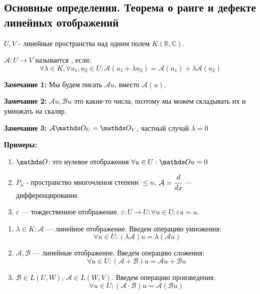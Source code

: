 \subsection{Основные определения. Теорема о ранге и дефекте линейных отображений}

 $U,V$ - линейные пространства над одним полем $K(\mathbb{R}, \mathbb{C})$.

$\mathcal{A}: U\rightarrow V$ называется , если: 
$$\forall \lambda \in K,\forall u_1, u_2 \in U: \mathcal{A}(u_1 + \lambda u_2) = \mathcal{A} (u_1) + \lambda\mathcal{A}(u_2)$$

\textbf{Замечание 1:} Мы будем писать $\mathcal{A} u$, вместо $\mathcal{A}(u)$.

\textbf{Замечание 2:} $\mathcal{A}u, \mathcal{B}u$ это какие-то числа, поэтому мы можем складывать их и умножать на скаляр.

\textbf{Замечание 3:} $\mathcal{A} \zero_U = \zero_V$, частный случай $\lambda = 0$

\textbf{Примеры:}
\begin{enumerate}
    \item $\zero$: это нулевое отображения $\forall u \in U: \zero u = 0$ 

     \item $P_n$ - пространство многочленов степени $\leq n$. $\mathcal{A}=\cfrac{d}{dx}$ --- дифференцирование.

    \item $\varepsilon$ --- тождественное отображение. $\varepsilon: U\rightarrow U:\forall u\in U: \varepsilon u = u$.
\end{enumerate}


\begin{enumerate}
    \item $\lambda \in K: \mathcal{A}$ --- линейное отображение. Введем операцию умножения:
$$\ \forall u \in U: (\lambda\mathcal{A}) u = \lambda(\mathcal{A} u)$$
    \item $\mathcal{A}, \mathcal{B}$ --- линейные отображение. Введем операцию сложения: 
    $$ \forall u \in U:(\mathcal{A} + \mathcal{B}) u = \mathcal{A}u + \mathcal{B}u $$
    

    \item  $\mathcal{B}\in L(U,W)$, $\mathcal{A} \in L(W,V)$. Введем операцию произведения:
    $$\forall u \in U:(\mathcal{A} \cdot \mathcal{B}) u = \mathcal{A}(\mathcal{B}u)$$
    
\end{enumerate}


